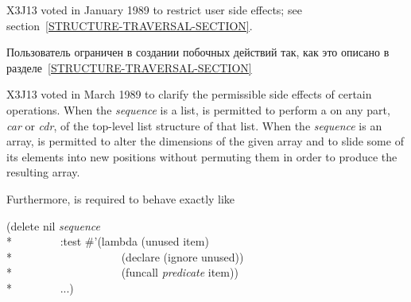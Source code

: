 \begin{defun}[Функция]
\begin{new}
X3J13 voted in January 1989
to restrict user side effects; see section~\ref{STRUCTURE-TRAVERSAL-SECTION}.
\end{new}

Пользователь ограничен в создании побочных действий так, как это описано в
разделе~\ref{STRUCTURE-TRAVERSAL-SECTION}

\begin{newer}
X3J13 voted in March 1989 
to clarify the permissible side effects of certain operations.
When the \emph{sequence} is a list,
 is permitted to perform a  on any part,
\emph{car} or \emph{cdr}, of the top-level list structure of that list.
When the \emph{sequence} is an array,
 is permitted to alter the dimensions of the given array
and to slide some of its elements into new positions without permuting them
in order to produce the resulting array.

Furthermore, 
is required to behave exactly like
\begin{lisp}
(delete nil \emph{sequence} \\*
~~~~~~~~:test \#'(lambda (unused item) \\*
~~~~~~~~~~~~~~~~~~~(declare (ignore unused)) \\*
~~~~~~~~~~~~~~~~~~~(funcall \emph{predicate} item)) \\*
~~~~~~~~...)
\end{lisp}
\end{newer}
\end{defun}

